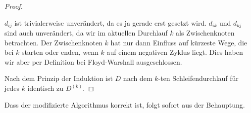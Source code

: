 \documentclass[11pt,a4paper]{article}
\begin{document}
\begin{loesung}
\begin{enumerate}
\begin{proof}
\begin{description}
                $d_{ij}$ ist trivialerweise unverändert, da es ja gerade erst gesetzt wird.
                $d_{ik}$ und $d_{kj}$ sind auch unverändert, da wir im aktuellen Durchlauf $k$ als Zwischenknoten betrachten. 
                Der Zwischenknoten $k$ hat nur dann Einfluss auf kürzeste Wege, die bei $k$ starten oder enden, wenn $k$ auf einem negativen Zyklus liegt.
                Dies haben wir aber per Definition bei Floyd-Warshall ausgeschlossen.
            \end{description}
            Nach dem Prinzip der Induktion ist $D$ nach dem $k$-ten Schleifendurchlauf für jedes $k$ identisch zu $D^{(k)}$.
        \end{proof}
        Dass der modifizierte Algorithmus korrekt ist, folgt sofort aus der Behauptung.
    \end{enumerate}
\end{loesung}
\end{document}
